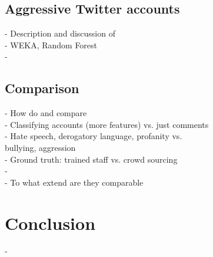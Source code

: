 \documentclass{proseminar}
\begin{document}
\subsection{Aggressive Twitter accounts}
- Description and discussion of \cite{Twitter:2017}\\
\hphantom{- }- WEKA, Random Forest\\
\hphantom{- }-

\subsection{Comparison}
- How do \cite{Yahoo:2016} and \cite{Twitter:2017} compare\\
\hphantom{- }- Classifying accounts (more features) vs. just comments\\
\hphantom{- }- Hate speech, derogatory language, profanity vs.\\
\hphantom{- - }bullying, aggression\\
\hphantom{- }- Ground truth: trained staff vs. crowd sourcing\\
\hphantom{- }- \\
- To what extend are they comparable

\section{Conclusion}
-
\end{document}
